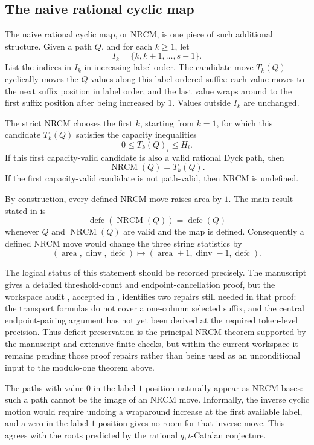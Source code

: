 \documentclass[11pt]{article}
\newcommand{\area}{\operatorname{area}}
\newcommand{\dinv}{\operatorname{dinv}}
\newcommand{\defc}{\operatorname{defc}}
\newcommand{\NRCM}{\operatorname{NRCM}}
\begin{document}
\subsection{The naive rational cyclic map}

The naive rational cyclic map, or NRCM, is one piece of such additional
structure.  Given a path \(Q\), and for each \(k\ge1\), let
\[
  I_k=\{k,k+1,\ldots,s-1\}.
\]
List the indices in \(I_k\) in increasing label order.  The candidate move
\(T_k(Q)\) cyclically moves the \(Q\)-values along this label-ordered suffix:
each value moves to the next suffix position in label order, and the last value
wraps around to the first suffix position after being increased by \(1\).
Values outside \(I_k\) are unchanged.

The strict NRCM chooses the first \(k\), starting from \(k=1\), for which this
candidate \(T_k(Q)\) satisfies the capacity inequalities
\[
  0\le T_k(Q)_i\le H_i.
\]
If this first capacity-valid candidate is also a valid rational Dyck path, then
\[
  \NRCM(Q)=T_k(Q).
\]
If the first capacity-valid candidate is not path-valid, then NRCM is
undefined.

By construction, every defined NRCM move raises area by \(1\).  The main
result stated in  is
\[
  \defc(\NRCM(Q))=\defc(Q)
\]
whenever \(Q\) and \(\NRCM(Q)\) are valid and the map is defined.  Consequently
a defined NRCM move would change the three string statistics by
\[
 (\area,\dinv,\defc)\longmapsto
 (\area+1,\dinv-1,\defc).
\]

The logical status of this statement should be recorded precisely.  The
manuscript gives a detailed threshold-count and endpoint-cancellation proof,
but the workspace audit , accepted in
, identifies two repairs still needed in that proof: the
transport formulas do not cover a one-column selected suffix, and the central
endpoint-pairing argument has not yet been derived at the required token-level
precision.  Thus deficit preservation is the principal NRCM theorem supported
by the manuscript and extensive finite checks, but within the current
workspace it remains pending those proof repairs rather than being used as an
unconditional input to the modulo-one theorem above.

The paths with value \(0\) in the label-\(1\) position naturally appear as
NRCM bases: such a path cannot be the image of an NRCM move.  Informally, the
inverse cyclic motion would require undoing a wraparound increase at the first
available label, and a zero in the label-\(1\) position gives no room for that
inverse move.  This agrees with the roots predicted by the rational
\(q,t\)-Catalan conjecture.
\end{document}
